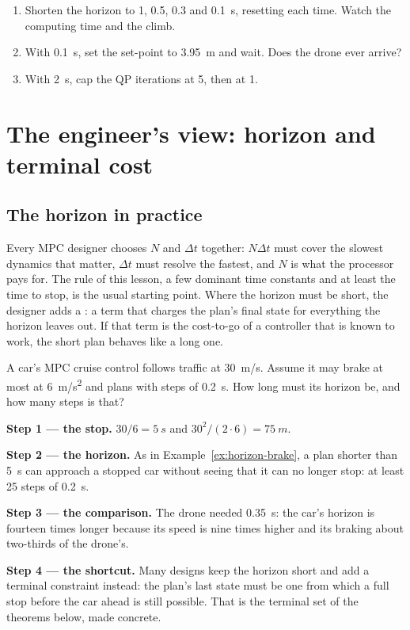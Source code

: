 \begin{trythis}
\begin{enumerate}
  \item Shorten the horizon to 1, 0.5, 0.3 and \SI{0.1}{s}, resetting each time. Watch the computing time and the climb.
  \item With \SI{0.1}{s}, set the set-point to \SI{3.95}{m} and wait. Does the drone ever arrive?
  \item With \SI{2}{s}, cap the QP iterations at 5, then at 1.
\end{enumerate}
\end{trythis}

\section{The engineer's view: horizon and terminal cost}

\subsection{The horizon in practice}
Every MPC designer chooses $N$ and $\Delta t$ together: $N\Delta t$ must cover the slowest dynamics that matter, $\Delta t$ must resolve the fastest, and $N$ is what the processor pays for. The rule of this lesson, a few dominant time constants and at least the time to stop, is the usual starting point. Where the horizon must be short, the designer adds a : a term that charges the plan's final state for everything the horizon leaves out. If that term is the cost-to-go of a controller that is known to work, the short plan behaves like a long one.

\begin{example}
\label{ex:horizon-car}
A car's MPC cruise control follows traffic at \SI{30}{m/s}. Assume it may brake at most at \SI{6}{m/s^2} and plans with steps of \SI{0.2}{s}. How long must its horizon be, and how many steps is that?

\textbf{Step 1 — the stop.} $30/6 = \SI{5}{s}$ and $30^2/(2 \cdot 6) = \SI{75}{m}$.

\textbf{Step 2 — the horizon.} As in Example~\ref{ex:horizon-brake}, a plan shorter than \SI{5}{s} can approach a stopped car without seeing that it can no longer stop: at least 25 steps of \SI{0.2}{s}.

\textbf{Step 3 — the comparison.} The drone needed \SI{0.35}{s}: the car's horizon is fourteen times longer because its speed is nine times higher and its braking about two-thirds of the drone's.

\textbf{Step 4 — the shortcut.} Many designs keep the horizon short and add a terminal constraint instead: the plan's last state must be one from which a full stop before the car ahead is still possible. That is the terminal set of the theorems below, made concrete.
\end{example}

